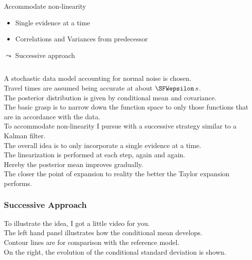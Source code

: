 \documentclass[aspectratio=169, t, 10pt, ]{beamer}
\begin{document}
\begin{frame}
\begin{columns}
    \begin{alertblock}{Accommodate non-linearity}
        \begin{itemize}
            \item Single evidence at a time
            \item Correlations and Variances from predecessor
        \end{itemize}
        \hfill {\Large $\leadsto$} Successive approach ~
    \end{alertblock}

\end{columns}

\end{frame}

A stochastic data model accounting for normal noise is chosen.
\\
Travel times are assumed being accurate at about $\SFWepsilon\,s$.
\\[2mm]

The posterior distribution is given by conditional mean and covariance.
\\
The basic grasp is to narrow down the function space to only those functions that are in accordance with the data.
\\[2mm]

To accommodate non-linearity I pursue with a successive strategy similar to a Kalman filter.
\\
The overall idea is to only incorporate a single evidence at a time.
\\
The linearization is performed at each step, again and again.
\\
Hereby the posterior mean improves gradually.
\\
The closer the point of expansion to reality the better the Taylor expansion performs.
\\[2mm]

\begin{frame}
    \frametitle{Successive Approach}
    \begin{center}
    \end{center}
\end{frame}

To illustrate the idea, I got a little video for you.
\\
The left hand panel illustrates how the conditional mean develops.
\\
Contour lines are for comparison with the reference model.
\\
On the right, the evolution of the conditional standard deviation is shown.
\\[2mm]
\end{document}
